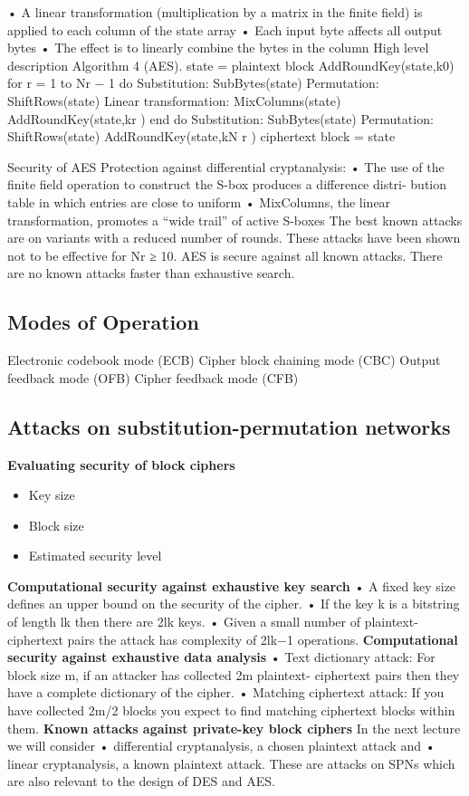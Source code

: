 • A linear transformation (multiplication by a matrix in the finite field) is applied to each column of the state array
• Each input byte affects all output bytes
• The effect is to linearly combine the bytes in the column
High level description
Algorithm 4 (AES). state = plaintext block AddRoundKey(state,k0)
for r = 1 to Nr − 1 do
Substitution: SubBytes(state) Permutation: ShiftRows(state)
Linear transformation: MixColumns(state)
AddRoundKey(state,kr ) end do
Substitution: SubBytes(state) Permutation: ShiftRows(state) AddRoundKey(state,kN r )
ciphertext block = state

Security of AES
Protection against differential cryptanalysis:
• The use of the finite field operation to construct the S-box produces a difference distri- bution table in which entries are close to uniform
• MixColumns, the linear transformation, promotes a “wide trail” of active S-boxes
The best known attacks are on variants with a reduced number of rounds. These attacks have
been shown not to be effective for Nr ≥ 10.
AES is secure against all known attacks. There are no known attacks faster than
exhaustive search.

\subsection{Modes of Operation}
Electronic codebook mode (ECB)
Cipher block chaining mode (CBC)
Output feedback mode (OFB)
Cipher feedback mode (CFB)

\subsection{Attacks on substitution-permutation networks}
\textbf{Evaluating security of block ciphers}
\begin{itemize}
    \item Key size
    \item Block size
    \item Estimated security level
\end{itemize}
\textbf{Computational security against exhaustive key search}
• A fixed key size defines an upper bound on the security of the cipher.
• If the key k is a bitstring of length lk then there are 2lk keys.
• Given a small number of plaintext-ciphertext pairs the attack has complexity of 2lk−1 operations.
\textbf{Computational security against exhaustive data analysis}
• Text dictionary attack: For block size m, if an attacker has collected 2m plaintext-
ciphertext pairs then they have a complete dictionary of the cipher.
• Matching ciphertext attack: If you have collected 2m/2 blocks you expect to find matching ciphertext blocks within them.
\textbf{Known attacks against private-key block ciphers}
In the next lecture we will consider
• differential cryptanalysis, a chosen plaintext attack and
• linear cryptanalysis, a known plaintext attack.
These are attacks on SPNs which are also relevant to the design of DES and AES.

